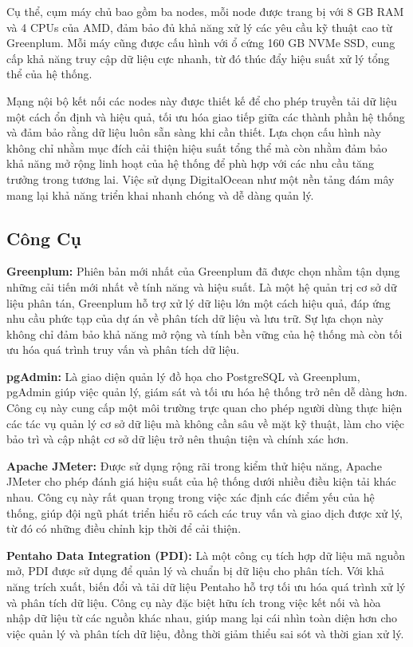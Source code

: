 Cụ thể, cụm máy chủ bao gồm ba nodes, mỗi node được trang bị với 8 GB RAM và 4 CPUs của AMD, đảm bảo đủ khả năng xử lý các yêu cầu kỹ thuật cao từ Greenplum. Mỗi máy cũng được cấu hình với ổ cứng 160 GB NVMe SSD, cung cấp khả năng truy cập dữ liệu cực nhanh, từ đó thúc đẩy hiệu suất xử lý tổng thể của hệ thống.

Mạng nội bộ kết nối các nodes này được thiết kế để cho phép truyền tải dữ liệu một cách ổn định và hiệu quả, tối ưu hóa giao tiếp giữa các thành phần hệ thống và đảm bảo rằng dữ liệu luôn sẵn sàng khi cần thiết. Lựa chọn cấu hình này không chỉ nhằm mục đích cải thiện hiệu suất tổng thể mà còn nhằm đảm bảo khả năng mở rộng linh hoạt của hệ thống để phù hợp với các nhu cầu tăng trưởng trong tương lai. Việc sử dụng DigitalOcean như một nền tảng đám mây mang lại khả năng triển khai nhanh chóng và dễ dàng quản lý.



\subsection{Công Cụ}

\textbf{Greenplum:} Phiên bản mới nhất của Greenplum đã được chọn nhằm tận dụng những cải tiến mới nhất về tính năng và hiệu suất. Là một hệ quản trị cơ sở dữ liệu phân tán, Greenplum hỗ trợ xử lý dữ liệu lớn một cách hiệu quả, đáp ứng nhu cầu phức tạp của dự án về phân tích dữ liệu và lưu trữ. Sự lựa chọn này không chỉ đảm bảo khả năng mở rộng và tính bền vững của hệ thống mà còn tối ưu hóa quá trình truy vấn và phân tích dữ liệu.

\textbf{pgAdmin:} Là giao diện quản lý đồ họa cho PostgreSQL và Greenplum, pgAdmin giúp việc quản lý, giám sát và tối ưu hóa hệ thống trở nên dễ dàng hơn. Công cụ này cung cấp một môi trường trực quan cho phép người dùng thực hiện các tác vụ quản lý cơ sở dữ liệu mà không cần sâu về mặt kỹ thuật, làm cho việc bảo trì và cập nhật cơ sở dữ liệu trở nên thuận tiện và chính xác hơn.

\textbf{Apache JMeter:} Được sử dụng rộng rãi trong kiểm thử hiệu năng, Apache JMeter cho phép đánh giá hiệu suất của hệ thống dưới nhiều điều kiện tải khác nhau. Công cụ này rất quan trọng trong việc xác định các điểm yếu của hệ thống, giúp đội ngũ phát triển hiểu rõ cách các truy vấn và giao dịch được xử lý, từ đó có những điều chỉnh kịp thời để cải thiện.

\textbf{Pentaho Data Integration (PDI):} Là một công cụ tích hợp dữ liệu mã nguồn mở, PDI được sử dụng để quản lý và chuẩn bị dữ liệu cho phân tích. Với khả năng trích xuất, biến đổi và tải dữ liệu Pentaho hỗ trợ tối ưu hóa quá trình xử lý và phân tích dữ liệu. Công cụ này đặc biệt hữu ích trong việc kết nối và hòa nhập dữ liệu từ các nguồn khác nhau, giúp mang lại cái nhìn toàn diện hơn cho việc quản lý và phân tích dữ liệu, đồng thời giảm thiểu sai sót và thời gian xử lý.


